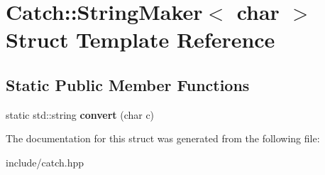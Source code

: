 \hypertarget{structCatch_1_1StringMaker_3_01char_01_4}{}\section{Catch\+:\+:String\+Maker$<$ char $>$ Struct Template Reference}
\label{structCatch_1_1StringMaker_3_01char_01_4}
\subsection*{Static Public Member Functions}
\begin{DoxyCompactItemize}
\item 
static std\+::string {\bfseries convert} (char c)\hypertarget{structCatch_1_1StringMaker_3_01char_01_4_a4e3db69a12bb83f3ef89251893e65da5}{}\label{structCatch_1_1StringMaker_3_01char_01_4_a4e3db69a12bb83f3ef89251893e65da5}

\end{DoxyCompactItemize}


The documentation for this struct was generated from the following file\+:\begin{DoxyCompactItemize}
\item 
include/catch.\+hpp\end{DoxyCompactItemize}
